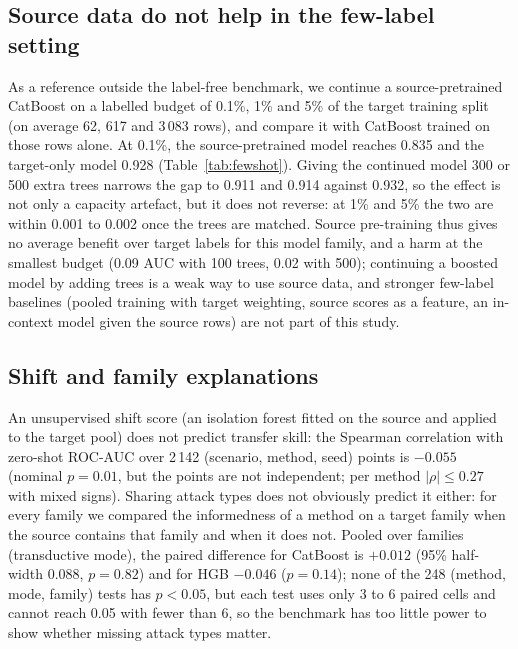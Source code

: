 \documentclass[11pt]{article}
\begin{document}
\subsection{Source data do not help in the few-label setting}
As a reference outside the label-free benchmark, we continue a source-pretrained CatBoost on a labelled budget of 0.1\%, 1\% and 5\% of the target training split (on average 62, 617 and 3\,083 rows), and compare it with CatBoost trained on those rows alone.
At 0.1\%, the source-pretrained model reaches 0.835 and the target-only model 0.928 (Table~\ref{tab:fewshot}).
Giving the continued model 300 or 500 extra trees narrows the gap to 0.911 and 0.914 against 0.932, so the effect is not only a capacity artefact, but it does not reverse: at 1\% and 5\% the two are within 0.001 to 0.002 once the trees are matched.
Source pre-training thus gives no average benefit over target labels for this model family, and a harm at the smallest budget (0.09 AUC with 100 trees, 0.02 with 500); continuing a boosted model by adding trees is a weak way to use source data, and stronger few-label baselines (pooled training with target weighting, source scores as a feature, an in-context model given the source rows) are not part of this study.

\begin{table}[t]
\centering\small
\caption{Few-label comparison over the 42 pairs, ROC-AUC. The continued model starts from a CatBoost trained on the source and adds the stated number of trees on the labelled target rows; the other model uses only those rows.}\label{tab:fewshot}

\end{table}

\subsection{Shift and family explanations}
An unsupervised shift score (an isolation forest fitted on the source and applied to the target pool) does not predict transfer skill: the Spearman correlation with zero-shot ROC-AUC over 2\,142 (scenario, method, seed) points is $-0.055$ (nominal $p=0.01$, but the points are not independent; per method $|\rho|\le0.27$ with mixed signs).
Sharing attack types does not obviously predict it either: for every family we compared the informedness of a method on a target family when the source contains that family and when it does not.
Pooled over families (transductive mode), the paired difference for CatBoost is $+0.012$ (95\% half-width 0.088, $p=0.82$) and for HGB $-0.046$ ($p=0.14$); none of the 248 (method, mode, family) tests has $p<0.05$, but each test uses only 3 to 6 paired cells and cannot reach 0.05 with fewer than 6, so the benchmark has too little power to show whether missing attack types matter.
\end{document}
